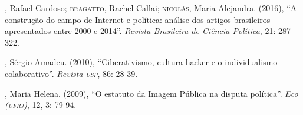 \begin{bibliohedra}
, Rafael Cardoso; \textsc{bragatto}, Rachel Callai; \textsc{nicolás}, Maria
Alejandra. (2016), ``A construção do campo de Internet e política:
análise dos artigos brasileiros apresentados entre 2000 e 2014''.
\emph{Revista Brasileira de Ciência Política}, 21: 287-322.

, Sérgio Amadeu. (2010), ``Ciberativismo, cultura hacker e o
individualismo colaborativo''. \emph{Revista \textsc{usp}}, 86: 28-39.

, Maria Helena. (2009), ``O estatuto da Imagem Pública na disputa
política''. \emph{Eco (\textsc{ufrj})}, 12, 3: 79-94.
\end{bibliohedra}